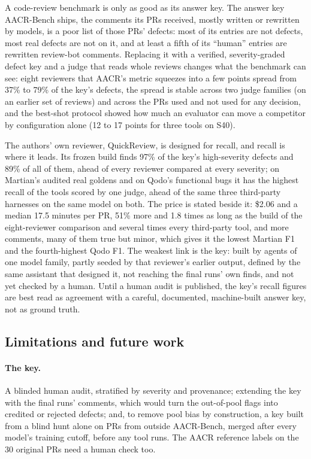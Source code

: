 \documentclass[11pt,a4paper]{article}
\newcommand{\qcr}{QuickReview}
\begin{document}
A code-review benchmark is only as good as its answer key. The answer key
AACR-Bench ships, the comments its PRs received, mostly written or rewritten
by models, is a poor list of those PRs' defects: most of its entries are not
defects, most real defects are not on it, and at least a fifth of its
``human'' entries are rewritten review-bot comments. Replacing it with a
verified, severity-graded defect key and a judge that reads whole reviews
changes what the benchmark can see: eight reviewers that AACR's metric
squeezes into a few points spread from 37\% to 79\% of the key's defects, the
spread is stable across two judge families (on an earlier set of reviews)
and across the PRs used and not used for any decision, and the best-shot
protocol showed how much an evaluator can move a competitor by configuration
alone (12 to 17 points for three tools on S40).

The authors' own reviewer, \qcr{}, is designed for recall, and recall is
where it leads. Its frozen build finds 97\% of the key's high-severity
defects and 89\% of all of them, ahead of every reviewer compared at every
severity; on Martian's audited real goldens and on Qodo's functional bugs it
has the highest recall of the tools scored by one judge, ahead of the same
three third-party harnesses on the same model on both. The price is stated
beside it: \$2.06 and a median 17.5 minutes per PR, 51\% more and 1.8 times
as long as the build of the eight-reviewer comparison and several times
every third-party tool, and more comments, many of them true but minor,
which gives it the lowest Martian F1 and the fourth-highest Qodo F1. The weakest link is the key: built by agents of
one model family, partly seeded by that reviewer's earlier output, defined by
the same assistant that designed it, not reaching the final runs' own finds,
and not yet checked by a human. Until a human audit is published, the key's
recall figures are best read as agreement with a careful, documented,
machine-built answer key, not as ground truth.

\subsection{Limitations and future work}
\label{sec:future}

\paragraph{The key.} A blinded human audit, stratified by severity and
provenance; extending the key with the final runs' comments,
which would turn the out-of-pool flags into credited or rejected defects; and,
to remove pool bias by construction, a key built from a blind hunt alone on
PRs from outside AACR-Bench, merged after every model's training cutoff,
before any tool runs. The AACR reference labels on the 30 original PRs need a
human check too.
\end{document}
